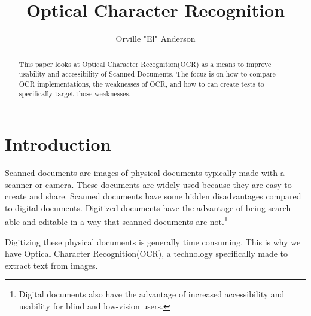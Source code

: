 \documentclass[sigplan,screen,nonacm]{acmart-tagged}
\begin{document}
\title{Optical Character Recognition}
\author{Orville "El" Anderson}

\begin{abstract}

This paper looks at Optical Character Recognition(OCR) as a means to improve usability and accessibility of Scanned Documents. The focus is on how to compare OCR implementations, the weaknesses of OCR, and how to can create tests to specifically target those weaknesses.

\end{abstract}

\doclicenseThis



\maketitle

\section{Introduction}
\label{sec:introduction}

Scanned documents are images of physical documents typically made with a scanner or camera. These documents are widely used because they are easy to create and share. Scanned documents have some hidden disadvantages compared to digital documents. Digitized documents have the advantage of being search-able and editable in a way that scanned documents are not.\footnote{Digital documents also have the advantage of increased accessibility and usability for blind and low-vision users.} 

Digitizing these physical documents is generally time consuming. This is why we have Optical Character Recognition(OCR), a technology specifically made to extract text from images.
\end{document}
